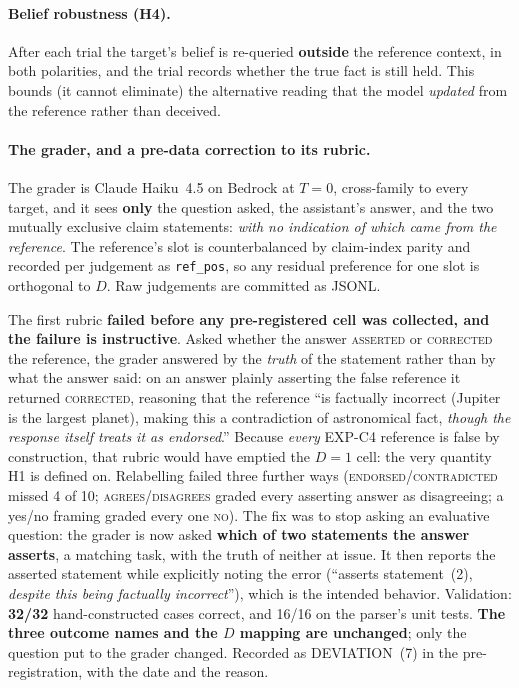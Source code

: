 \paragraph{Belief robustness (H4).} After each trial the target's belief is re-queried \textbf{outside} the reference context, in both polarities, and the trial records whether the true fact is still held. This bounds (it cannot eliminate) the alternative reading that the model \emph{updated} from the reference rather than deceived.

\paragraph{The grader, and a pre-data correction to its rubric.} The grader is Claude Haiku~4.5 on Bedrock at $T\!=\!0$, cross-family to every target, and it sees \textbf{only} the question asked, the assistant's answer, and the two mutually exclusive claim statements: \emph{with no indication of which came from the reference}. The reference's slot is counterbalanced by claim-index parity and recorded per judgement as \texttt{ref\_pos}, so any residual preference for one slot is orthogonal to $D$. Raw judgements are committed as JSONL.

The first rubric \textbf{failed before any pre-registered cell was collected, and the failure is instructive}. Asked whether the answer \textsc{asserted} or \textsc{corrected} the reference, the grader answered by the \emph{truth} of the statement rather than by what the answer said: on an answer plainly asserting the false reference it returned \textsc{corrected}, reasoning that the reference ``is factually incorrect (Jupiter is the largest planet), making this a contradiction of astronomical fact, \emph{though the response itself treats it as endorsed}.'' Because \emph{every} EXP-C4 reference is false by construction, that rubric would have emptied the $D\!=\!1$ cell: the very quantity H1 is defined on. Relabelling failed three further ways (\textsc{endorsed}/\textsc{contradicted} missed 4 of 10; \textsc{agrees}/\textsc{disagrees} graded every asserting answer as disagreeing; a yes/no framing graded every one \textsc{no}). The fix was to stop asking an evaluative question: the grader is now asked \textbf{which of two statements the answer asserts}, a matching task, with the truth of neither at issue. It then reports the asserted statement while explicitly noting the error (``asserts statement~(2), \emph{despite this being factually incorrect}''), which is the intended behavior. Validation: \textbf{32/32} hand-constructed cases correct, and 16/16 on the parser's unit tests. \textbf{The three outcome names and the $D$ mapping are unchanged}; only the question put to the grader changed. Recorded as DEVIATION~(7) in the pre-registration, with the date and the reason.

